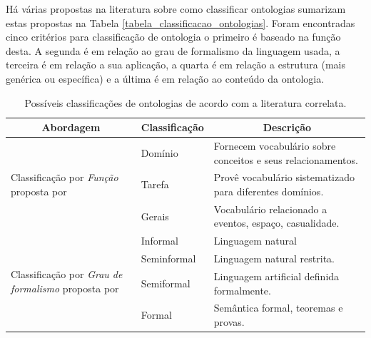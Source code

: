Há várias propostas na literatura sobre como classificar ontologias  sumarizam estas propostas na Tabela \ref{tabela_classificacao_ontologias}. Foram encontradas cinco critérios para classificação de ontologia o primeiro é baseado na função desta. A segunda é em relação ao grau de formalismo da linguagem usada, a terceira é em relação a sua aplicação, a quarta é em relação a estrutura (mais genérica ou específica) e a última é em relação ao conteúdo da ontologia.
\bgroup
\def\arraystretch{2}
\begin{table}[htbp]
\tiny
\centering
\caption{Possíveis classificações de ontologias de acordo com a literatura correlata.}
\begin{tabular}{lll}  \hline
\multicolumn{1}{c}{\textbf{Abordagem}} & \multicolumn{1}{c}{\textbf{Classificação}} &  \multicolumn{1}{c}{\textbf{Descrição}} \\  \hline
\multirow{3}{*}{\parbox{3cm}{Classificação por \emph{Função} proposta por }} 			& Domínio       		& Fornecem vocabulário sobre conceitos e seus relacionamentos. \\
				                   						& Tarefa        		& Provê vocabulário sistematizado para diferentes domínios.\\
				                   						& Gerais         		& Vocabulário relacionado a eventos, espaço, casualidade.  \\
\hline 
\multirow{4}{*}{\parbox{3cm}{Classificação por \emph{Grau de formalismo} proposta por  }} 	& Informal       		& Linguagem natural  \\ [0.1cm] 
										                & Seminformal        	& Linguagem natural restrita.     			 \\ 
										                & Semiformal         	& Linguagem artificial definida formalmente. \\ 
										                & Formal             	& Semântica formal, teoremas e provas.       \\ 
						                

\end{tabular}
\end{table}
